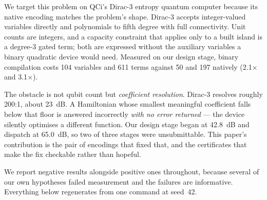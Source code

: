 \documentclass[11pt,twocolumn]{article}
\begin{document}
We target this problem on QCi's Dirac-3 entropy quantum computer because its native encoding matches the problem's shape. Dirac-3 accepts integer-valued variables directly and polynomials to fifth degree with full connectivity. Unit counts are integers, and a capacity constraint that applies only to a built island is a degree-3 gated term; both are expressed without the auxiliary variables a binary quadratic device would need. Measured on our design stage, binary compilation costs 104 variables and 611 terms against 50 and 197 natively (2.1$\times$ and 3.1$\times$).

The obstacle is not qubit count but {\em coefficient resolution}. Dirac-3 resolves roughly 200:1, about 23~dB. A Hamiltonian whose smallest meaningful coefficient falls below that floor is answered incorrectly {\em with no error returned} --- the device silently optimises a different function. Our design stage began at 42.8~dB and dispatch at 65.0~dB, so two of three stages were unsubmittable. This paper's contribution is the pair of encodings that fixed that, and the certificates that make the fix checkable rather than hopeful.

We report negative results alongside positive ones throughout, because several of our own hypotheses failed measurement and the failures are informative. Everything below regenerates from one command at seed~42.
\end{document}
